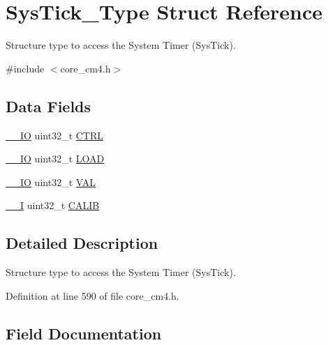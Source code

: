 \hypertarget{struct_sys_tick___type}{}\section{Sys\+Tick\+\_\+\+Type Struct Reference}
\label{struct_sys_tick___type}


Structure type to access the System Timer (Sys\+Tick).  




{\ttfamily \#include $<$core\+\_\+cm4.\+h$>$}

\subsection*{Data Fields}
\begin{DoxyCompactItemize}
\item 
\hyperlink{group___c_m_s_i_s__core__definitions_gaec43007d9998a0a0e01faede4133d6be}{\+\_\+\+\_\+\+IO} uint32\+\_\+t \hyperlink{struct_sys_tick___type_a15fc8d35f045f329b80c544bef35ff64}{C\+T\+RL}
\item 
\hyperlink{group___c_m_s_i_s__core__definitions_gaec43007d9998a0a0e01faede4133d6be}{\+\_\+\+\_\+\+IO} uint32\+\_\+t \hyperlink{struct_sys_tick___type_aad9adf4efc940cddb8161b69cfbe19d3}{L\+O\+AD}
\item 
\hyperlink{group___c_m_s_i_s__core__definitions_gaec43007d9998a0a0e01faede4133d6be}{\+\_\+\+\_\+\+IO} uint32\+\_\+t \hyperlink{struct_sys_tick___type_a26fb318c3b0a0ec7f45daafd5f8799a3}{V\+AL}
\item 
\hyperlink{group___c_m_s_i_s__core__definitions_gaf63697ed9952cc71e1225efe205f6cd3}{\+\_\+\+\_\+I} uint32\+\_\+t \hyperlink{struct_sys_tick___type_a40e07d0a4638a676780713b6ceeec4ef}{C\+A\+L\+IB}
\end{DoxyCompactItemize}


\subsection{Detailed Description}
Structure type to access the System Timer (Sys\+Tick). 

Definition at line 590 of file core\+\_\+cm4.\+h.



\subsection{Field Documentation}
\mbox{\label{struct_sys_tick___type_a40e07d0a4638a676780713b6ceeec4ef}} 
